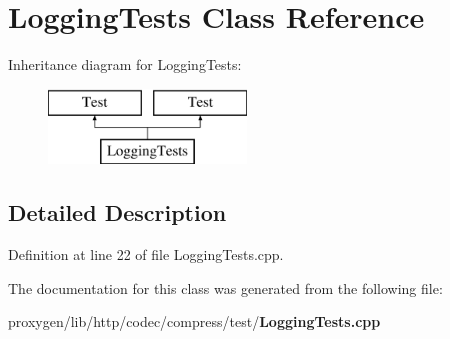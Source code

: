 \section{Logging\+Tests Class Reference}
\label{classLoggingTests}
Inheritance diagram for Logging\+Tests\+:\begin{figure}[H]
\begin{center}
\leavevmode
\includegraphics[height=2.000000cm]{classLoggingTests}
\end{center}
\end{figure}


\subsection{Detailed Description}


Definition at line 22 of file Logging\+Tests.\+cpp.



The documentation for this class was generated from the following file\+:\begin{DoxyCompactItemize}
\item 
proxygen/lib/http/codec/compress/test/{\bf Logging\+Tests.\+cpp}\end{DoxyCompactItemize}
